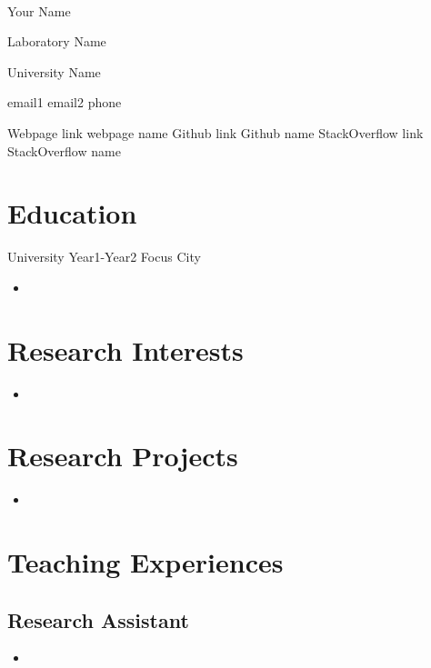 \documentclass{cv_class}
\begin{document}
\\

\name
{
  Your Name
}

\lab
{
  Laboratory Name
}

\university
{
  University Name
}

\contact
{email1}
{email2}
{phone}

\pages
{Webpage link}       %
{webpage name}       %
{Github link}        %
{Github name}        %
{StackOverflow link} %
{StackOverflow name} %

\large

\section{Education}
\datedsubsection
{University}
{Year1-Year2} 
{Focus} 
{City} 

\begin{itemize}
\item
\end{itemize}


\section{Research Interests}
\begin{itemize}
\item
\end{itemize}


\section{Research Projects}
\begin{itemize}
\item
\end{itemize}


\section{Teaching Experiences}
\subsection{Research Assistant}
\begin{itemize}
\item
\end{itemize}
\end{document}
